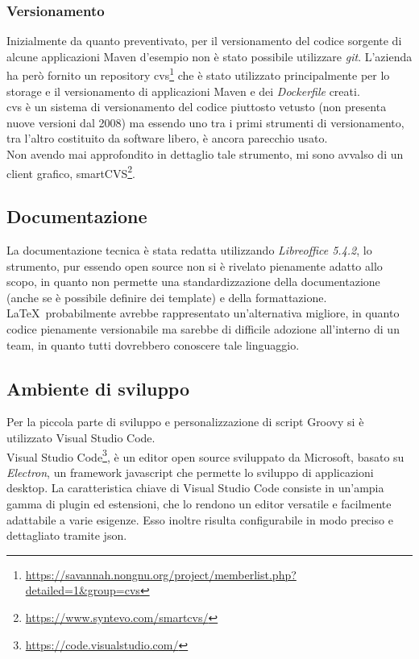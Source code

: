 {\subsubsection{Versionamento}
Inizialmente da quanto preventivato, per il versionamento del codice sorgente di alcune applicazioni Maven d'esempio non è stato possibile utilizzare \textit{git}. L'azienda ha però fornito un \gls{repository} \gls{cvs}\footnote{\url{https://savannah.nongnu.org/project/memberlist.php?detailed=1&group=cvs}} che è stato utilizzato principalmente per lo storage e il versionamento di applicazioni Maven e dei \textit{Dockerfile} creati. \\

\gls{cvs} è un sistema di versionamento del codice piuttosto vetusto (non presenta nuove versioni dal 2008) ma essendo uno tra i primi strumenti di versionamento, tra l'altro costituito da software libero, è ancora parecchio usato. \\
Non avendo mai approfondito in dettaglio tale strumento, mi sono avvalso di un client grafico, smartCVS\footnote{\url{https://www.syntevo.com/smartcvs/}}.

\subsection{Documentazione}
La documentazione tecnica è stata redatta utilizzando \textit{Libreoffice 5.4.2}, lo strumento, pur essendo open source non si è rivelato pienamente adatto allo scopo, in quanto non permette una standardizzazione della documentazione (anche se è possibile definire dei template) e della formattazione. \LaTeX\ probabilmente avrebbe rappresentato un'alternativa migliore, in quanto codice pienamente versionabile ma sarebbe di difficile adozione all'interno di un team, in quanto tutti dovrebbero conoscere tale linguaggio. 

\subsection{Ambiente di sviluppo}
Per la piccola parte di sviluppo e personalizzazione di script Groovy si è utilizzato Visual Studio Code. \\
Visual Studio Code\footnote{\url{https://code.visualstudio.com/}}, è un editor open source sviluppato da Microsoft, basato su \textit{Electron}, un framework javascript che permette lo sviluppo di applicazioni desktop.
La caratteristica chiave di Visual Studio Code consiste in un'ampia gamma di \gls{plugin} ed estensioni, che lo rendono un editor versatile e facilmente adattabile a varie esigenze. Esso inoltre risulta configurabile in modo preciso e dettagliato tramite \gls{json}. 

}
